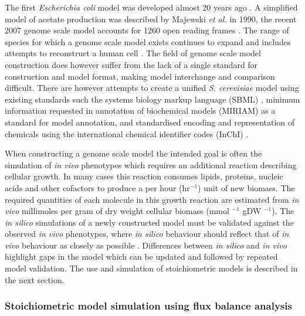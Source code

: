 The first \emph{Escherichia coli} model was developed almost 20 years ago \cite{feist2008}. A simplified model of acetate production was described by Majewski \emph{et al.} in 1990, the recent 2007 genome scale model accounts for 1260 open reading frames \cite{feist2007}. The range of species for which a genome scale model exists continues to expand and includes attempts to reconstruct a human cell \cite{duarte2007}. The field of genome scale model construction does however suffer from the lack of a single standard for construction and model format, making model interchange and comparison difficult. There are however attempts to create a unified \emph{S. cerevisiae} model \cite{herrgard2008} using existing standards such the systems biology markup language (SBML) \cite{hucka2003}, minimum information requested in annotation of biochemical models (MIRIAM) \cite{lenovere2005} as a standard for model annotation, and standardised encoding and representation of chemicals using the international chemical identifier codes (InChI) \cite{coles2005}.

When constructing a genome scale model the intended goal is often the simulation of \emph{in vivo} phenotypes which requires an additional reaction describing cellular growth. In many cases this reaction consumes lipids, proteins, nucleic acids and other cofactors to produce a per hour (hr$^{-1}$) unit of new biomass. The required quantities of each molecule in this growth reaction are estimated from \emph{in vivo} millimoles per gram of dry weight cellular biomass (mmol $^{-1}$ gDW $^{-1}$). The \emph{in silico} simulations of a newly constructed model must be validated against the observed \emph{in vivo} phenotypes, where \emph{in silico} behaviour should reflect that of \emph{in vivo} behaviour as closely as possible \cite{famili2003}. Differences between \emph{in silico} and \emph{in vivo} highlight gaps in the model which can be updated and followed by repeated model validation. The use and simulation of stoichiometric models is described in the next section.

\subsubsection{Stoichiometric model simulation using flux balance analysis}%

